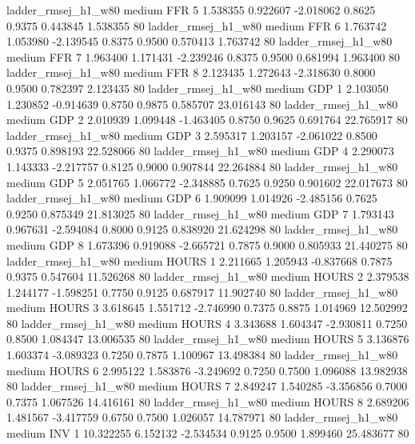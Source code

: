    ladder_rmsej_h1_w80     medium      FFR                 5  1.538355 0.922607 -2.018062 0.8625 0.9375  0.443845    1.538355 80
   ladder_rmsej_h1_w80     medium      FFR                 6  1.763742 1.053980 -2.139545 0.8375 0.9500  0.570413    1.763742 80
   ladder_rmsej_h1_w80     medium      FFR                 7  1.963400 1.171431 -2.239246 0.8375 0.9500  0.681994    1.963400 80
   ladder_rmsej_h1_w80     medium      FFR                 8  2.123435 1.272643 -2.318630 0.8000 0.9500  0.782397    2.123435 80
   ladder_rmsej_h1_w80     medium      GDP                 1  2.103050 1.230852 -0.914639 0.8750 0.9875  0.585707   23.016143 80
   ladder_rmsej_h1_w80     medium      GDP                 2  2.010939 1.099448 -1.463405 0.8750 0.9625  0.691764   22.765917 80
   ladder_rmsej_h1_w80     medium      GDP                 3  2.595317 1.203157 -2.061022 0.8500 0.9375  0.898193   22.528066 80
   ladder_rmsej_h1_w80     medium      GDP                 4  2.290073 1.143333 -2.217757 0.8125 0.9000  0.907844   22.264884 80
   ladder_rmsej_h1_w80     medium      GDP                 5  2.051765 1.066772 -2.348885 0.7625 0.9250  0.901602   22.017673 80
   ladder_rmsej_h1_w80     medium      GDP                 6  1.909099 1.014926 -2.485156 0.7625 0.9250  0.875349   21.813025 80
   ladder_rmsej_h1_w80     medium      GDP                 7  1.793143 0.967631 -2.594084 0.8000 0.9125  0.838920   21.624298 80
   ladder_rmsej_h1_w80     medium      GDP                 8  1.673396 0.919088 -2.665721 0.7875 0.9000  0.805933   21.440275 80
   ladder_rmsej_h1_w80     medium    HOURS                 1  2.211665 1.205943 -0.837668 0.7875 0.9375  0.547604   11.526268 80
   ladder_rmsej_h1_w80     medium    HOURS                 2  2.379538 1.244177 -1.598251 0.7750 0.9125  0.687917   11.902740 80
   ladder_rmsej_h1_w80     medium    HOURS                 3  3.618645 1.551712 -2.746990 0.7375 0.8875  1.014969   12.502992 80
   ladder_rmsej_h1_w80     medium    HOURS                 4  3.343688 1.604347 -2.930811 0.7250 0.8500  1.084347   13.006535 80
   ladder_rmsej_h1_w80     medium    HOURS                 5  3.136876 1.603374 -3.089323 0.7250 0.7875  1.100967   13.498384 80
   ladder_rmsej_h1_w80     medium    HOURS                 6  2.995122 1.583876 -3.249692 0.7250 0.7500  1.096088   13.982938 80
   ladder_rmsej_h1_w80     medium    HOURS                 7  2.849247 1.540285 -3.356856 0.7000 0.7375  1.067526   14.416161 80
   ladder_rmsej_h1_w80     medium    HOURS                 8  2.689206 1.481567 -3.417759 0.6750 0.7500  1.026057   14.787971 80
   ladder_rmsej_h1_w80     medium      INV                 1 10.322255 6.152132 -2.534534 0.9125 0.9500  1.899460   25.483677 80

